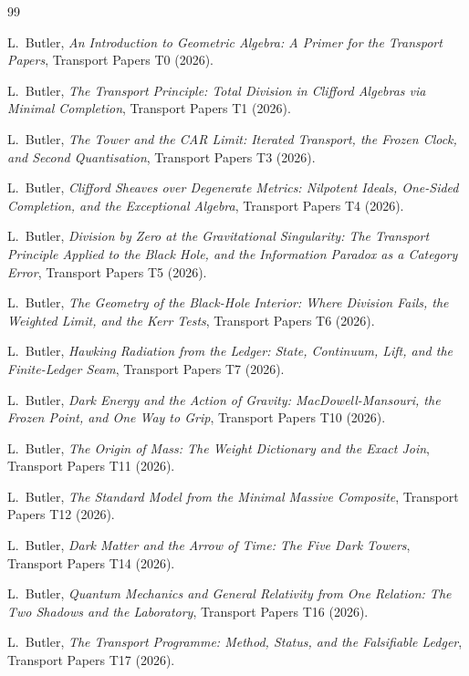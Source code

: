 \documentclass[11pt]{article}
\theoremstyle{definition}
\begin{document}
\begin{thebibliography}{99}

L.~Butler,
\emph{An Introduction to Geometric Algebra: A Primer for the Transport Papers},
Transport Papers T0 (2026).

L.~Butler,
\emph{The Transport Principle: Total Division in Clifford Algebras via Minimal Completion},
Transport Papers T1 (2026).

L.~Butler,
\emph{The Tower and the CAR Limit: Iterated Transport, the Frozen Clock, and Second Quantisation},
Transport Papers T3 (2026).

L.~Butler,
\emph{Clifford Sheaves over Degenerate Metrics: Nilpotent Ideals, One-Sided Completion, and the Exceptional Algebra},
Transport Papers T4 (2026).

L.~Butler,
\emph{Division by Zero at the Gravitational Singularity: The Transport Principle Applied to the Black Hole, and the Information Paradox as a Category Error},
Transport Papers T5 (2026).

L.~Butler,
\emph{The Geometry of the Black-Hole Interior: Where Division Fails, the Weighted Limit, and the Kerr Tests},
Transport Papers T6 (2026).

L.~Butler,
\emph{Hawking Radiation from the Ledger: State, Continuum, Lift, and the Finite-Ledger Seam},
Transport Papers T7 (2026).

L.~Butler,
\emph{Dark Energy and the Action of Gravity: MacDowell-Mansouri, the Frozen Point, and One Way to Grip},
Transport Papers T10 (2026).

L.~Butler,
\emph{The Origin of Mass: The Weight Dictionary and the Exact Join},
Transport Papers T11 (2026).

L.~Butler,
\emph{The Standard Model from the Minimal Massive Composite},
Transport Papers T12 (2026).

L.~Butler,
\emph{Dark Matter and the Arrow of Time: The Five Dark Towers},
Transport Papers T14 (2026).

L.~Butler,
\emph{Quantum Mechanics and General Relativity from One Relation: The Two Shadows and the Laboratory},
Transport Papers T16 (2026).

L.~Butler,
\emph{The Transport Programme: Method, Status, and the Falsifiable Ledger},
Transport Papers T17 (2026).


\end{thebibliography}
\end{document}
